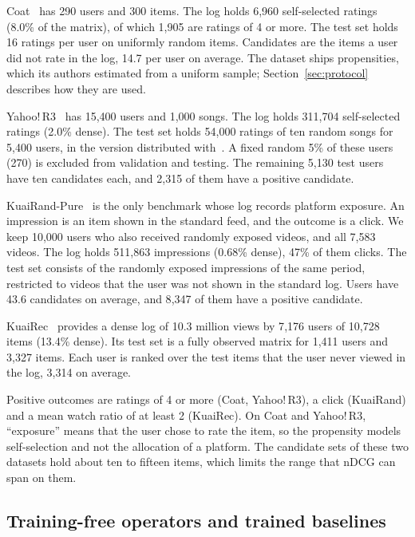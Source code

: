 Coat~\citep{schnabel2016} has 290 users and 300 items. The log holds 6{,}960 self-selected ratings (8.0\% of the
matrix), of which 1{,}905 are ratings of 4 or more. The test set holds 16 ratings per user on uniformly random
items. Candidates are the items a user did not rate in the log, 14.7 per user on average. The dataset ships
propensities, which its authors estimated from a uniform sample; Section~\ref{sec:protocol} describes how they
are used.

Yahoo!\,R3~\citep{marlin2009collaborative} has 15{,}400 users and 1{,}000 songs. The log holds 311{,}704
self-selected ratings (2.0\% dense). The test set holds 54{,}000 ratings of ten random songs for 5{,}400 users,
in the version distributed with~\citep{chen2021autodebias}. A fixed random 5\% of these users (270) is excluded
from validation and testing. The remaining 5{,}130 test users have ten candidates each, and 2{,}315 of them have
a positive candidate.

KuaiRand-Pure~\citep{gao2022kuairand} is the only benchmark whose log records platform exposure. An impression
is an item shown in the standard feed, and the outcome is a click. We keep 10{,}000 users who also received
randomly exposed videos, and all 7{,}583 videos. The log holds 511{,}863 impressions (0.68\% dense), 47\% of them
clicks. The test set consists of the randomly exposed impressions of the same period, restricted to videos that
the user was not shown in the standard log. Users have 43.6 candidates on average, and 8{,}347 of them have a
positive candidate.

KuaiRec~\citep{gao2022kuairec} provides a dense log of 10.3 million views by 7{,}176 users of 10{,}728 items
(13.4\% dense). Its test set is a fully observed matrix for 1{,}411 users and 3{,}327 items. Each user is ranked
over the test items that the user never viewed in the log, 3{,}314 on average.

Positive outcomes are ratings of 4 or more (Coat, Yahoo!\,R3), a click (KuaiRand) and a mean watch ratio of at
least 2 (KuaiRec). On Coat and Yahoo!\,R3, ``exposure'' means that the user chose to rate the item, so the
propensity models self-selection and not the allocation of a platform. The candidate sets of these two datasets
hold about ten to fifteen items, which limits the range that nDCG can span on them.

\subsection{Training-free operators and trained baselines}\label{sec:baselines}

